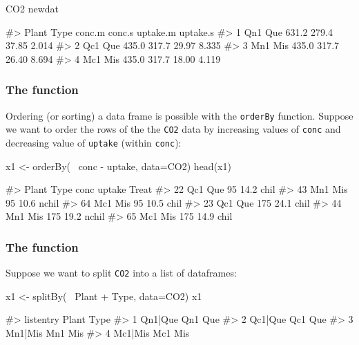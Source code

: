 \begin{Schunk}
\begin{Sinput}
CO2 %
newdat
\end{Sinput}
\begin{Soutput}
#>   Plant Type conc.m conc.s uptake.m uptake.s
#> 1   Qn1  Que  631.2  279.4    37.85    2.014
#> 2   Qc1  Que  435.0  317.7    29.97    8.335
#> 3   Mn1  Mis  435.0  317.7    26.40    8.694
#> 4   Mc1  Mis  435.0  317.7    18.00    4.119
\end{Soutput}
\end{Schunk}

\hypertarget{the-function-1}{%
\subsubsection{\texorpdfstring{The 
function}{The  function}}\label{the-function-1}}

Ordering (or sorting) a data frame is possible with the \texttt{orderBy}
function. Suppose we want to order the rows of the the \texttt{CO2} data
by increasing values of \texttt{conc} and decreasing value of
\texttt{uptake} (within \texttt{conc}):

\begin{Schunk}
\begin{Sinput}
x1 <- orderBy(~ conc - uptake, data=CO2)
head(x1)
\end{Sinput}
\begin{Soutput}
#>    Plant Type conc uptake Treat
#> 22   Qc1  Que   95   14.2  chil
#> 43   Mn1  Mis   95   10.6 nchil
#> 64   Mc1  Mis   95   10.5  chil
#> 23   Qc1  Que  175   24.1  chil
#> 44   Mn1  Mis  175   19.2 nchil
#> 65   Mc1  Mis  175   14.9  chil
\end{Soutput}
\end{Schunk}

\hypertarget{the-function-2}{%
\subsubsection{\texorpdfstring{The 
function}{The  function}}\label{the-function-2}}

Suppose we want to split \texttt{CO2} into a list of dataframes:

\begin{Schunk}
\begin{Sinput}
x1 <- splitBy(~ Plant + Type, data=CO2)
x1
\end{Sinput}
\begin{Soutput}
#>   listentry Plant Type
#> 1   Qn1|Que   Qn1  Que
#> 2   Qc1|Que   Qc1  Que
#> 3   Mn1|Mis   Mn1  Mis
#> 4   Mc1|Mis   Mc1  Mis
\end{Soutput}
\end{Schunk}

